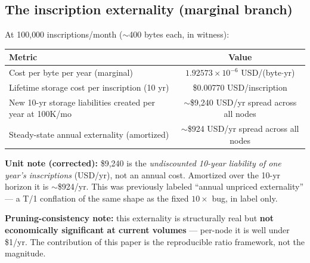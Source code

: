 \documentclass[11pt]{article}
\begin{document}
\subsection{The inscription externality (marginal branch)}\label{sec:5.2}
At 100{,}000 inscriptions/month ($\sim$400 bytes each, in witness):
\begin{center}
\begin{tabular}{lc}
\toprule
Metric & Value \\
\midrule
Cost per byte per year (marginal) & $1.92573\times10^{-6}$ USD/(byte$\cdot$yr) \\
Lifetime storage cost per inscription (10 yr) & \$0.00770 USD/inscription \\
New 10-yr storage liabilities created per year at 100K/mo & $\sim$\$9{,}240 USD/yr spread across all nodes \\
Steady-state annual externality (amortized) & $\sim$\$924 USD/yr spread across all nodes \\
\bottomrule
\end{tabular}
\end{center}
\textbf{Unit note (corrected):} \$9{,}240 is the \emph{undiscounted 10-year liability of one year's inscriptions} (USD/yr), not an annual cost. Amortized over the 10-yr horizon it is $\sim$\$924/yr. This was previously labeled ``annual unpriced externality'' --- a T/1 conflation of the same shape as the fixed $10\times$ bug, in label only.

\textbf{Pruning-consistency note:} this externality is structurally real but \textbf{not economically significant at current volumes} --- per-node it is well under \$1/yr. The contribution of this paper is the reproducible ratio framework, not the magnitude.
\end{document}
